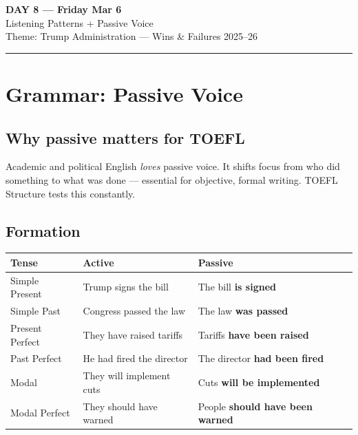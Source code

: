 \documentclass[10pt,a4paper]{article}
\begin{document}
\begin{center}
{\LARGE \textbf{DAY 8 --- Friday Mar 6}}\\[4pt]
{\large Listening Patterns + Passive Voice}\\[2pt]
{\normalsize Theme: Trump Administration --- Wins \& Failures 2025--26}\\[2pt]
\rule{\textwidth}{0.8pt}
\end{center}

\section*{Grammar: Passive Voice}

\subsection*{Why passive matters for TOEFL}

Academic and political English \emph{loves} passive voice. It
shifts focus from who did something to what was done --- essential
for objective, formal writing. TOEFL Structure tests this constantly.

\subsection*{Formation}

\begin{center}
\begin{tabular}{lll}
\toprule
\textbf{Tense} & \textbf{Active} & \textbf{Passive} \\
\midrule
Simple Present & Trump signs the bill & The bill \textbf{is signed} \\
Simple Past & Congress passed the law & The law \textbf{was passed} \\
Present Perfect & They have raised tariffs & Tariffs \textbf{have been raised} \\
Past Perfect & He had fired the director & The director \textbf{had been fired} \\
Modal & They will implement cuts & Cuts \textbf{will be implemented} \\
Modal Perfect & They should have warned & People \textbf{should have been warned} \\
\bottomrule
\end{tabular}
\end{center}
\end{document}
